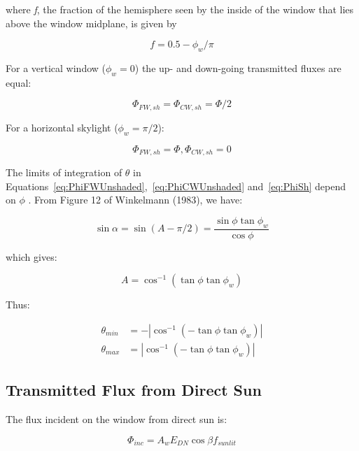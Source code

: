 where \emph{f}, the fraction of the hemisphere seen by the inside of the window that lies above the window midplane, is given by

\begin{equation}
f = 0.5 - {\phi_w}/\pi
\end{equation}

For a vertical window (\({\phi_w} = 0\)) the up- and down-going transmitted fluxes are equal:

\begin{equation}
{\Phi_{FW,sh}} = {\Phi_{CW,sh}} = \Phi /2
\end{equation}

For a horizontal skylight (\({\phi_w} = \pi /2\)):

\begin{equation}
{\Phi_{FW,sh}} = \Phi ,{\Phi_{CW,sh}} = 0
\end{equation}

The limits of integration of \({\theta}\) in Equations~\ref{eq:PhiFWUnshaded},~\ref{eq:PhiCWUnshaded} and~\ref{eq:PhiSh} depend on \(\phi\) . From Figure 12 of Winkelmann (1983), we have:

\begin{equation}
\sin \alpha  = \sin (A - \pi /2) = \frac{{\sin \phi \tan {\phi_w}}}{{\cos \phi }}
\end{equation}

which gives:

\begin{equation}
A = {\cos ^{ - 1}}(\tan \phi \tan {\phi_w})
\end{equation}

Thus:

\begin{equation}
\begin{array}{rl}
    \theta_{min} & =  - \left| \cos^{-1}(-\tan\phi\tan\phi_w) \right| \\
    \theta_{max} & = \left| \cos^{-1}(-\tan\phi\tan\phi_w) \right|
\end{array}
\end{equation}

\subsection{Transmitted Flux from Direct Sun}\label{transmitted-flux-from-direct-sun}

The flux incident on the window from direct sun is:

\begin{equation}
{\Phi_{inc}} = {A_w}{E_{DN}}\cos \beta {f_{sunlit}}
\end{equation}

